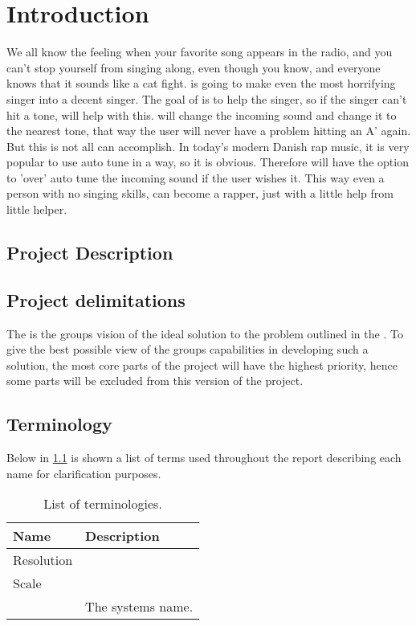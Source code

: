 
\chapter{Introduction}
\label{sec:introduction}
We all know the feeling when your favorite song appears in the radio, and you can't stop yourself from singing along, even though you know, and everyone knows that it sounds like a cat fight.
\systemName is going to make even the most horrifying singer into a decent singer.
The goal of \systemName is to help the singer, so if the singer can't hit a tone, \systemName will help with this. \systemName will change the incoming sound and change it to the nearest tone, that way the user will never have a problem hitting an A' again.
But this is not all \systemName can accomplish. In today's modern Danish rap music, it is very popular to use auto tune in a way, so it is obvious.
Therefore \systemName will have the option to 'over' auto tune the incoming sound if the user wishes it.
This way even a person with no singing skills, can become a rapper, just with a little help from little helper.

\section{Project Description}
\label{sec:projectDescription}


\section{Project delimitations}
\label{sec:delimitations}
The  is the groups vision of the ideal solution to the problem outlined in the .  
To give the best possible view of the groups capabilities in developing such a solution, the most core parts of the project will have the highest priority, hence some parts will be excluded from this version of the project. 

\section{Terminology}
\label{sec:terminology}
Below in \cref{tab:terminology} is shown a list of terms used throughout the report describing each name for clarification purposes.

\begin{table}[H]
	\centering
	\begin{tabularx}{0.8\textwidth}{l X}
		\toprule
		\textbf{Name} & \textbf{Description} \\
		\midrule
		Resolution & \\
		Scale & \\
		\systemName & The systems name. \\
		\bottomrule
	\end{tabularx}
	\caption{List of terminologies.}
	\label{tab:terminology}
\end{table}